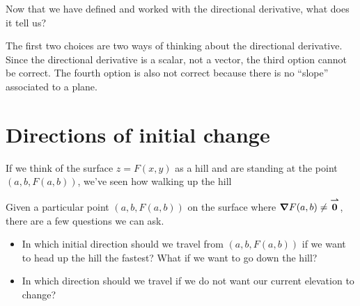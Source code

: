 \documentclass{ximera}
\begin{document}
\begin{question}
Now that we have defined and worked with the directional derivative,
what does it tell us?
\begin{selectAll}
\end{selectAll}
\begin{feedback}
  The first two choices are two ways of thinking about the directional derivative.  Since the directional derivative is a scalar, not a vector, the third option cannot be correct.  The fourth option is also not correct because there is no ``slope'' associated to a plane.
\end{feedback}
\end{question}

%
%

\section{Directions of initial change}
If we think of the surface $z=F(x,y)$ as a hill and are standing at
the point $(a,b,F(a,b))$, we've seen how walking up the hill

Given a particular point $(a,b,F(a,b))$ on the surface where $\boldsymbol\nabla{F}(a,b) \neq {\overset{\boldsymbol{\rightharpoonup}}{\mathbf{0}}}$, there are a few questions we can ask.

\begin{itemize}
\item In which initial direction should we travel from $(a,b,F(a,b))$
  if we want to head up the hill the fastest? What if we want to go
  down the hill?
\item In which direction should we travel if we do not want our current elevation to change?
\end{itemize}
\end{document}
